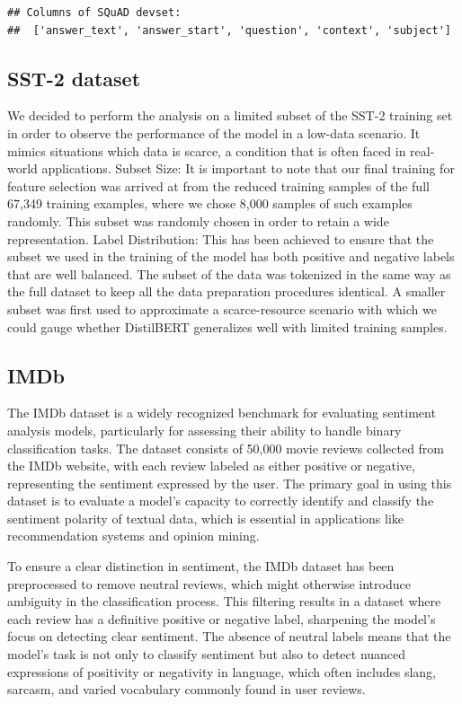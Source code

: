 \documentclass[
  11pt,
]{article}
\begin{document}
\begin{verbatim}
## Columns of SQuAD devset:
##  ['answer_text', 'answer_start', 'question', 'context', 'subject']
\end{verbatim}

\subsection{SST-2 dataset}\label{sst-2-dataset}

We decided to perform the analysis on a limited subset of the SST-2
training set in order to observe the performance of the model in a
low-data scenario. It mimics situations which data is scarce, a
condition that is often faced in real-world applications. Subset Size:
It is important to note that our final training for feature selection
was arrived at from the reduced training samples of the full 67,349
training examples, where we chose 8,000 samples of such examples
randomly. This subset was randomly chosen in order to retain a wide
representation. Label Distribution: This has been achieved to ensure
that the subset we used in the training of the model has both positive
and negative labels that are well balanced. The subset of the data was
tokenized in the same way as the full dataset to keep all the data
preparation procedures identical. A smaller subset was first used to
approximate a scarce-resource scenario with which we could gauge whether
DistilBERT generalizes well with limited training samples.


\subsection{IMDb}\label{glue-benchmark}

The IMDb dataset is a widely recognized benchmark for evaluating sentiment analysis models, particularly for assessing their ability to handle binary classification tasks. The dataset consists of 50,000 movie reviews collected from the IMDb website, with each review labeled as either positive or negative, representing the sentiment expressed by the user. The primary goal in using this dataset is to evaluate a model's capacity to correctly identify and classify the sentiment polarity of textual data, which is essential in applications like recommendation systems and opinion mining.

To ensure a clear distinction in sentiment, the IMDb dataset has been preprocessed to remove neutral reviews, which might otherwise introduce ambiguity in the classification process. This filtering results in a dataset where each review has a definitive positive or negative label, sharpening the model's focus on detecting clear sentiment. The absence of neutral labels means that the model's task is not only to classify sentiment but also to detect nuanced expressions of positivity or negativity in language, which often includes slang, sarcasm, and varied vocabulary commonly found in user reviews.
\end{document}
